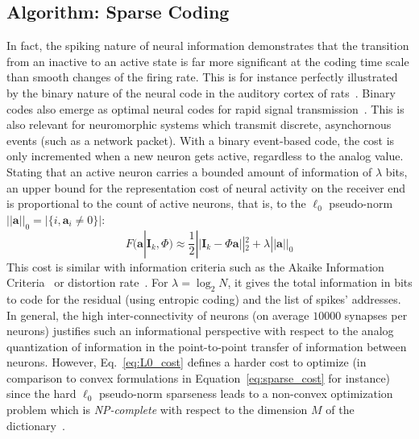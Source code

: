 \documentclass[a4paper, 11pt, draft]{article} %
\newcommand{\coef}{\mathbf{a}} %
\newcommand{\image}{\mathbf{I}} %
\newcommand{\dico}{\Phi} %
\newcommand{\enscond}[2]{\lbrace #1, #2 \rbrace}
\newcommand{\norm}[1]{|\!| #1 |\!|}
\newcommand{\abs}[1]{\left|#1\right|}
\newcommand{\seeEq}[1]{Eq.~\ref{eq:#1}}%
\begin{document}
\subsection{Algorithm: Sparse Coding}
In fact, the spiking nature of neural information demonstrates that the transition from an inactive to an active state is far more significant at the coding time scale than smooth changes of the firing rate. 
This is for instance perfectly illustrated by the binary nature of the neural code in the auditory cortex of rats~\citep{DeWeese03}. Binary codes also emerge as optimal neural codes for rapid signal transmission~\citep{Bethge03}. This is also relevant for neuromorphic systems which transmit discrete, asynchornous events (such as a network packet). With a binary event-based code, the cost is only incremented when a new neuron gets active, regardless to the analog value. Stating that an active neuron carries a bounded amount of information of $\lambda$ bits, an upper bound for the representation cost of neural activity on the receiver end is proportional to the count of active neurons, that is, to the $\ell_0$ pseudo-norm $\norm{\coef}_0 = \abs{\enscond{i}{\coef_i \neq 0}}$:%
\begin{equation}%
F( \coef | \image_k , \dico) \approx  \frac{1}{2} \norm{\image_k - \dico \coef}_2^2 + \lambda\norm{\coef}_0%
\label{eq:L0_cost}%
\end{equation}%
This cost is similar with information criteria such as the Akaike Information Criteria~\citep{Akaike74} or distortion rate~\citep[p.~571]{Mallat98}. For $\lambda=\log_2 N$, it gives the total information in bits to code for the residual (using entropic coding) and the list of spikes' addresses. In general, the high inter-connectivity of neurons (on average $10000$ synapses per neurons) justifies such an informational perspective with respect to the analog quantization of information in the point-to-point transfer of information between neurons. 
However, \seeEq{L0_cost} defines a harder cost to optimize (in comparison to convex formulations in Equation~\ref{eq:sparse_cost} for instance) since the hard $\ell_0$ pseudo-norm sparseness leads to a non-convex optimization problem which is \emph{NP-complete} with respect to the dimension $M$ of the dictionary~\citep[p.~418]{Mallat98}.
\end{document}
